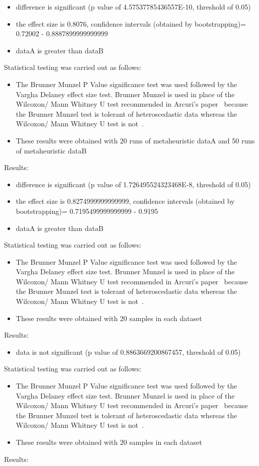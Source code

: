 \documentclass[]{article}
\begin{document}
\begin{itemize}
\item{difference is significant (p value of 4.57537785436557E-10, threshold of 0.05)}
\item{the effect size is 0.8076, confidence intervals (obtained by bootstrapping)= 0.72002 - 0.8887899999999999}
\item{dataA is greater than dataB}
\end{itemize}Statistical testing was carried out as follows: \begin{itemize}
\item{The Brunner Munzel P Value significance test was used followed by the Vargha Delaney effect size test. Brunner Munzel is used in place of the  Wilcoxon/ Mann Whitney U test recommended in Arcuri's paper~\cite{Arcuri2012} because the Brunner Munzel test is tolerant of heteroscedastic data whereas the Wilcoxon/ Mann Whitney U test is not~\cite{Brunner2000}.}
\item{These results were obtained with 20 runs of metaheuristic dataA and 50 runs of metaheuristic dataB}
\end{itemize}Results:
\begin{itemize}
\item{difference is significant (p value of 1.726495524323468E-8, threshold of 0.05)}
\item{the effect size is 0.8274999999999999, confidence intervals (obtained by bootstrapping)= 0.7195499999999999 - 0.9195}
\item{dataA is greater than dataB}
\end{itemize}Statistical testing was carried out as follows: \begin{itemize}
\item{The Brunner Munzel P Value significance test was used followed by the Vargha Delaney effect size test. Brunner Munzel is used in place of the  Wilcoxon/ Mann Whitney U test recommended in Arcuri's paper~\cite{Arcuri2012} because the Brunner Munzel test is tolerant of heteroscedastic data whereas the Wilcoxon/ Mann Whitney U test is not~\cite{Brunner2000}.}
\item{These results were obtained with 20 samples in each dataset}
\end{itemize}Results:
\begin{itemize}
\item{data is not significant (p value of 0.8863669200867457, threshold of 0.05)}
\end{itemize}Statistical testing was carried out as follows: \begin{itemize}
\item{The Brunner Munzel P Value significance test was used followed by the Vargha Delaney effect size test. Brunner Munzel is used in place of the  Wilcoxon/ Mann Whitney U test recommended in Arcuri's paper~\cite{Arcuri2012} because the Brunner Munzel test is tolerant of heteroscedastic data whereas the Wilcoxon/ Mann Whitney U test is not~\cite{Brunner2000}.}
\item{These results were obtained with 20 samples in each dataset}
\end{itemize}Results:
\end{document}

